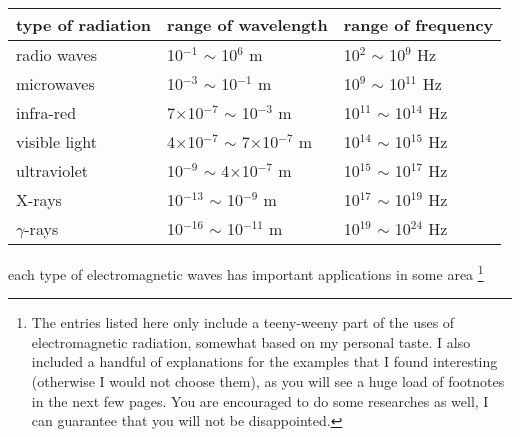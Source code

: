 \begin{center}
	\begin{tabular}{|C{4cm}|C{4cm}|C{4cm}|}
		\hline type of radiation & range of wavelength & range of frequency \\ 
		\hline radio waves  & 10$^{-1}$ $\sim$ 10$^{6}$ m & 10$^{2}$ $\sim$ 10$^{9}$ Hz \\ 
		\hline microwaves & 10$^{-3}$ $\sim$ 10$^{-1}$ m & 10$^{9}$ $\sim$ 10$^{11}$ Hz \\ 
		\hline infra-red & 7$\times$10$^{-7}$ $\sim$ 10$^{-3}$ m & 10$^{11}$ $\sim$ 10$^{14}$ Hz \\ 
		\hline visible light  & 4$\times$10$^{-7}$ $\sim$ 7$\times$10$^{-7}$ m & 10$^{14}$ $\sim$ 10$^{15}$ Hz \\ 
		\hline ultraviolet & 10$^{-9}$ $\sim$ 4$\times$10$^{-7}$ m & 10$^{15}$ $\sim$ 10$^{17}$ Hz \\ 
		\hline X-rays & 10$^{-13}$ $\sim$ 10$^{-9}$ m & 10$^{17}$ $\sim$ 10$^{19}$ Hz \\ 
		\hline $\gamma$-rays & 10$^{-16}$ $\sim$ 10$^{-11}$ m & 10$^{19}$ $\sim$ 10$^{24}$ Hz\\ 
		\hline
	\end{tabular} 
\end{center}

\cmt each type of electromagnetic waves has important applications in some area
\footnote{The entries listed here only include a teeny-weeny part of the uses of electromagnetic radiation, somewhat based on my personal taste. I also included a handful of explanations for the examples that I found interesting (otherwise I would not choose them), as you will see a huge load of footnotes in the next few pages. You are encouraged to do some researches as well, I can guarantee that you will not be disappointed.}


